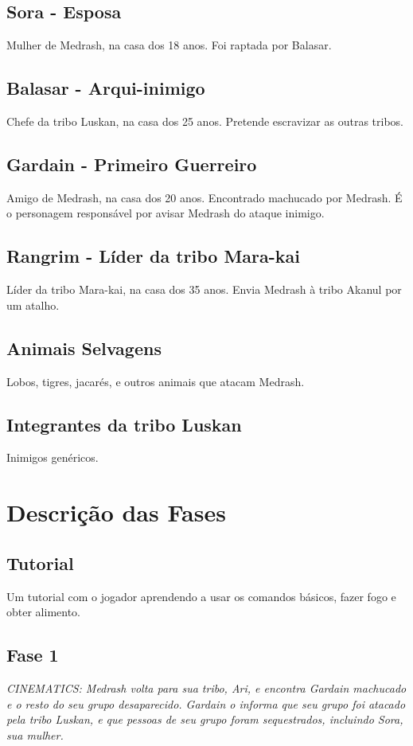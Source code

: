 \documentclass[letterpaper,11pt]{article}
\begin{document}
\subsection{Sora - Esposa}
Mulher de Medrash, na casa dos 18 anos. Foi raptada por Balasar.

\subsection{Balasar - Arqui-inimigo}
Chefe da tribo Luskan, na casa dos 25 anos. Pretende escravizar as outras tribos.

\subsection{Gardain - Primeiro Guerreiro}
Amigo de Medrash, na casa dos 20 anos. Encontrado machucado por Medrash. É o personagem responsável por avisar Medrash do ataque inimigo.

\subsection{Rangrim - Líder da tribo Mara-kai}
Líder da tribo Mara-kai, na casa dos 35 anos.
Envia Medrash à tribo Akanul por um atalho.

\subsection{Animais Selvagens}
Lobos, tigres, jacarés, e outros animais que atacam Medrash.

\subsection{Integrantes da tribo Luskan}
Inimigos genéricos.

\section{Descrição das Fases}
  \subsection{Tutorial}
Um tutorial com o jogador aprendendo a usar os comandos básicos, fazer fogo e obter alimento.

  \subsection{Fase 1}
{\it CINEMATICS: Medrash volta para sua tribo, Ari, e encontra Gardain machucado e o resto do seu grupo desaparecido.
Gardain o informa que seu grupo foi atacado pela tribo Luskan, e que pessoas de seu grupo foram sequestrados, incluindo Sora, sua mulher.}
\end{document}
